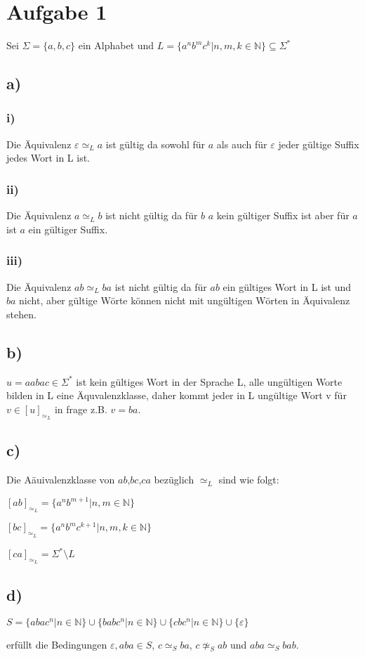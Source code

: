 \section*{Aufgabe 1}

Sei $\Sigma = \{a,b,c\}$ ein Alphabet und $L = \{ a^nb^mc^k|n,m,k \in \mathbb{N} \} \subseteq \Sigma^*$

\subsection*{a)}

\subsubsection*{i)}

Die Äquivalenz $\varepsilon \simeq_L a$ ist gültig da sowohl für $a$ als auch für $\varepsilon$
jeder gültige Suffix jedes Wort in L ist.

\subsubsection*{ii)}

Die Äquivalenz $a \simeq_L b$ ist nicht gültig da für $b$ $a$ kein gültiger Suffix ist aber für $a$ ist $a$ ein gültiger Suffix.

\subsubsection*{iii)}

Die Äquivalenz $ab \simeq_L ba$ ist nicht gültig da für $ab$ ein gültiges Wort in L ist und $ba$ nicht, aber gültige Wörte können nicht mit ungültigen Wörten in Äquivalenz stehen.

\subsection*{b)}

$u = aabac \in \Sigma^*$ ist kein gültiges Wort in der Sprache L, alle ungültigen Worte bilden in L eine Äquvalenzklasse, daher kommt jeder in L ungültige Wort v für $v \in [u]_{\simeq_L}$ in frage z.B. $v = ba$.

\subsection*{c)}
Die Aäuivalenzklasse von $ab$,$bc$,$ca$ bezüglich $\simeq_L$ sind wie folgt:

$[ab]_{\simeq_L} = \{a^nb^{m+1}|n,m \in \mathbb{N}\} $

$[bc]_{\simeq_L} = \{a^nb^mc^{k+1}|n,m,k \in \mathbb{N} \}$ 

$[ca]_{\simeq_L} = \Sigma^* \setminus L$ 

\subsection*{d)}

$S = \{abac^n | n \in \mathbb{N} \} \cup \{babc^n | n \in \mathbb{N} \} \cup \{cbc^n|n\in \mathbb{N}\} \cup \{\varepsilon\}$

erfüllt die Bedingungen $\varepsilon, aba \in S$, $c \simeq_S ba$, $c \not\simeq_S ab$ und $aba \simeq_S bab$.
